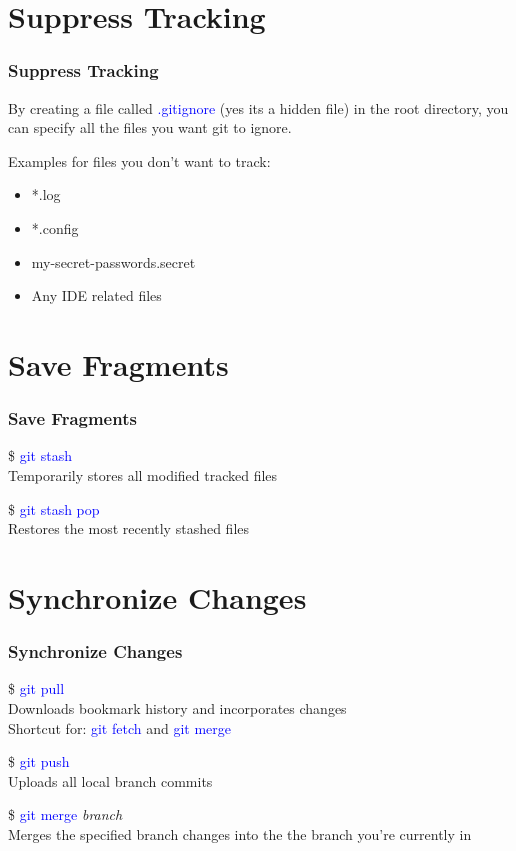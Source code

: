 \documentclass[aspectratio=169]{beamer}
\begin{document}
\section{Suppress Tracking}
\begin{frame}

\frametitle{Suppress Tracking}

By creating a file called \textcolor{blue}{.gitignore} (yes its a hidden file) in the root directory, you can specify all the files you want git to ignore.

\pause

Examples for files you don't want to track:

\begin{itemize}

\item *.log
\item *.config
\item my-secret-passwords.secret
\item Any IDE related files

\end{itemize}

\end{frame}

\section{Save Fragments}
\begin{frame}

\frametitle{Save Fragments}

\$ \textcolor{blue}{git stash}\\
Temporarily stores all modified tracked files

\pause

\$ \textcolor{blue}{git stash pop}\\
Restores the most recently stashed files

\end{frame}

\section{Synchronize Changes}
\begin{frame}

\frametitle{Synchronize Changes}

\$ \textcolor{blue}{git pull}\\
Downloads bookmark history and incorporates changes\\
Shortcut for: \textcolor{blue}{git fetch} and \textcolor{blue}{git merge}

\pause

\$ \textcolor{blue}{git push}\\
Uploads all local branch commits

\pause

\$ \textcolor{blue}{git merge} \textit{branch}\\
Merges the specified branch changes into the the branch you're currently in

\end{frame}
\end{document}
